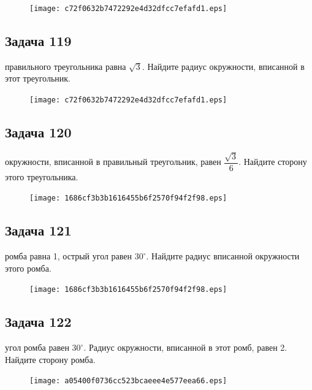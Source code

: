 \documentclass[a4paper,10pt]{article} %
\begin{document}
\begin{spacing}{1.0}
{\vspace{1.5cm}

\begin{figure}{\texttt{[image: c72f0632b7472292e4d32dfcc7efafd1.eps]}}\end{figure}
\subsection*{Задача 119}
 правильного треугольника равна $\sqrt{3}$. Найдите радиус окружности, вписанной в этот треугольник.

\vspace{2cm}

\begin{figure}{\texttt{[image: c72f0632b7472292e4d32dfcc7efafd1.eps]}}\end{figure}
\subsection*{Задача 120}
 окружности, вписанной в правильный треугольник, равен $\dfrac{\sqrt{3}}{6}$. Найдите сторону этого треугольника.

\vspace{1.5cm}

\begin{figure}{\texttt{[image: 1686cf3b3b1616455b6f2570f94f2f98.eps]}}\end{figure}
\subsection*{Задача 121}
 ромба равна 1, острый угол равен $30^\circ$. Найдите радиус вписанной окружности этого ромба.

\vspace{1.5cm}

\begin{figure}{\texttt{[image: 1686cf3b3b1616455b6f2570f94f2f98.eps]}}\end{figure}
\subsection*{Задача 122}
 угол ромба равен $30^\circ$. Радиус окружности, вписанной в этот ромб, равен 2.
Найдите сторону ромба.

\vspace{1.5cm}

\begin{figure}{\texttt{[image: a05400f0736cc523bcaeee4e577eea66.eps]}}\end{figure}
}
\end{spacing}
\end{document}
